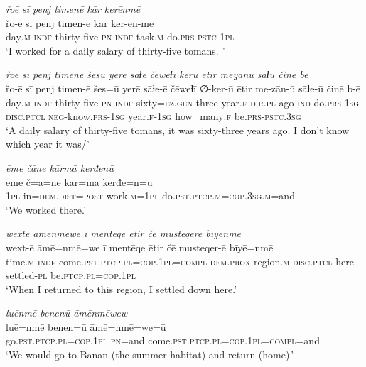 \ea \label{ŽM.46}
\textit{řoē sī penj timenē kār kerēnmē} \\ 
\gll řo-ē sī penj timen-ē kār ker-ēn-mē \\ 
 day\textsc{.m}\textsc{-indf} thirty five \textsc{pn}\textsc{-indf} task\textsc{.m} do\textsc{.prs}\textsc{-pstc}\textsc{-\textsc{1pl}} \\ 
\glt `I worked for a daily salary of thirty-five tomans. '
\z 
 
\ea \label{ŽM.49}
\textit{řoē sī penj timenē šesū yerē sāɫē čēweɫī kerū ētir meyānū sāɫū činē bē} \\ 
\gll řo-ē sī penj timen-ē šes=ū yerē sāɫe-ē čēweɫī ∅-ker-ū ētir me-zān-ū sāɫe-ū činē b-ē \\ 
 day\textsc{.m}\textsc{-indf} thirty five \textsc{pn}\textsc{-indf} sixty\textsc{=ez.gen} three year\textsc{.f}\textsc{-dir}\textsc{.pl} ago \textsc{ind-}do\textsc{.prs}\textsc{-\textsc{1sg}} \textsc{disc}.\textsc{ptcl} \textsc{neg-}know\textsc{.prs}\textsc{-\textsc{1sg}} year\textsc{.f}\textsc{-\textsc{1sg}} how\_many\textsc{.f} be\textsc{.prs}\textsc{-pstc}\textsc{.3sg} \\ 
\glt `A daily salary of thirty-five tomans, it was sixty-three years ago. I don’t know which year it was/'
\z 
 
\ea \label{ŽM.50}
\textit{ēme čāne kārmā kerđenū} \\ 
\gll ēme č=ā=ne kār=mā kerđe=n=ū \\ 
 \textsc{1pl} in=\textsc{dem.dist}\textsc{=\textsc{post}} work\textsc{.m}\textsc{=\textsc{1pl}} do\textsc{.pst}\textsc{.ptcp}\textsc{.m}\textsc{=cop}\textsc{.3sg}\textsc{.m}=and \\ 
\glt `We worked there.'
\z 
 
\ea \label{ŽM.51}
\textit{wextē āmēnmēwe ī mentēqe ētir čē musteqerē bīyēnmē} \\ 
\gll wext-ē āmē=nmē=we ī mentēqe ētir čē musteqer-ē bīyē=nmē \\ 
 time\textsc{.m}\textsc{-indf} come\textsc{.pst}\textsc{.ptcp}\textsc{.pl}\textsc{=cop}\textsc{.\textsc{1pl}}\textsc{=compl} \textsc{dem.prox} region\textsc{.m} \textsc{disc}.\textsc{ptcl} here settled\textsc{\textsc{-pl}} be\textsc{.ptcp}\textsc{.pl}\textsc{=cop}\textsc{.\textsc{1pl}} \\ 
\glt `When I returned to this region, I settled down here.'
\z 
 
\ea \label{ŽM.52}
\textit{luēnmē benenū āmēnmēwew} \\ 
\gll luē=nmē benen=ū āmē=nmē=we=ū \\ 
 go\textsc{.pst}\textsc{.ptcp}\textsc{.pl}\textsc{=cop}\textsc{.\textsc{1pl}} \textsc{pn}=and come\textsc{.pst}\textsc{.ptcp}\textsc{.pl}\textsc{=cop}\textsc{.\textsc{1pl}}\textsc{=compl}=and \\ 
\glt `We would go to Banan (the summer habitat) and return (home).'
\z 
 
